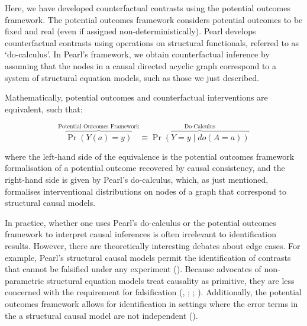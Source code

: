 \documentclass[
  single column]{article}
\begin{document}
Here, we have developed counterfactual contrasts using the potential
outcomes framework. The potential outcomes framework considers potential
outcomes to be fixed and real (even if assigned non-deterministically).
Pearl develops counterfactual contrasts using operations on structural
functionals, referred to as `do-calculus'. In Pearl's framework, we
obtain counterfactual inference by assuming that the nodes in a causal
directed acyclic graph correspond to a system of structural equation
models, such as those we just described.

Mathematically, potential outcomes and counterfactual interventions are
equivalent, such that:

\[
\overbrace{\Pr(Y(a) = y)}^{\text{Potential Outcomes Framework}} \equiv \overbrace{\Pr(Y = y \mid do(A = a))}^{\text{Do-Calculus}}
\]

where the left-hand side of the equivalence is the potential outcomes
framework formalisation of a potential outcome recovered by causal
consistency, and the right-hand side is given by Pearl's do-calculus,
which, as just mentioned, formalises interventional distributions on
nodes of a graph that correspond to structural causal models.

In practice, whether one uses Pearl's do-calculus or the potential
outcomes framework to interpret causal inferences is often irrelevant to
identification results. However, there are theoretically interesting
debates about edge cases. For example, Pearl's structural causal models
permit the identification of contrasts that cannot be falsified under
any experiment (). Because advocates of non-parametric structural equation models
treat causality as primitive, they are less concerned with the
requirement for falsification (, ;
;
).
Additionally, the potential outcomes framework allows for identification
in settings where the error terms in the a structural causal model are
not independent ().
\end{document}
